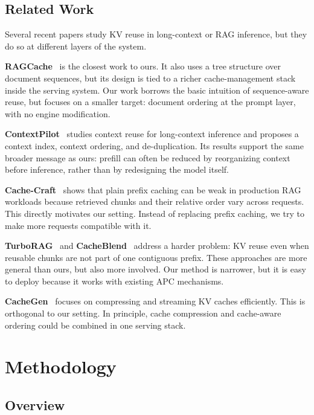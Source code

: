 \documentclass{article}
\begin{document}
\subsection{Related Work}

Several recent papers study KV reuse in long-context or RAG inference, but they do so at different layers of the system.

\textbf{RAGCache}~\citep{jin2025ragcache} is the closest work to ours. It also uses a tree structure over document sequences, but its design is tied to a richer cache-management stack inside the serving system. Our work borrows the basic intuition of sequence-aware reuse, but focuses on a smaller target: document ordering at the prompt layer, with no engine modification.

\textbf{ContextPilot}~\citep{contextpilot2025} studies context reuse for long-context inference and proposes a context index, context ordering, and de-duplication. Its results support the same broader message as ours: prefill can often be reduced by reorganizing context before inference, rather than by redesigning the model itself.

\textbf{Cache-Craft}~\citep{cachecraft2025} shows that plain prefix caching can be weak in production RAG workloads because retrieved chunks and their relative order vary across requests. This directly motivates our setting. Instead of replacing prefix caching, we try to make more requests compatible with it.

\textbf{TurboRAG}~\citep{turborag2024} and \textbf{CacheBlend}~\citep{yao2025cacheblend} address a harder problem: KV reuse even when reusable chunks are not part of one contiguous prefix. These approaches are more general than ours, but also more involved. Our method is narrower, but it is easy to deploy because it works with existing APC mechanisms.

\textbf{CacheGen}~\citep{lmcache2024} focuses on compressing and streaming KV caches efficiently. This is orthogonal to our setting. In principle, cache compression and cache-aware ordering could be combined in one serving stack.


\section{Methodology}
\label{sec:design}

\subsection{Overview}
\end{document}
